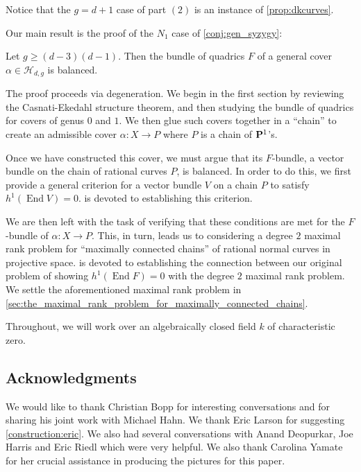\documentclass[11pt, two side, letterpaper, final]{amsart}
\renewcommand{\P}{{\bf P}}
\newcommand {\from}{\colon}
\DeclareMathOperator{\End}{End}
\renewcommand{\H}{{\mathcal{H}}}
\begin{document}
\begin{remark}
Notice that the $g = d+1$ case of part $(2)$ is an instance of  \cref{prop:dkcurves}.
\end{remark}




  Our main result is the proof of the $N_{1}$ case of \autoref{conj:gen_syzygy}:
\begin{maintheorem}\label{thm:gen_CE}
Let $g \geq (d-3)(d-1)$. Then the bundle of quadrics $F$ of a general cover $\alpha \in  \H_{d,g}$ is balanced.
\end{maintheorem}

The proof proceeds via degeneration.  We begin in the first section by reviewing the Casnati-Ekedahl structure theorem, and then studying the bundle of quadrics for covers of genus $0$ and $1$. We then glue such covers together in a ``chain'' to create an admissible cover $\alpha \from X \to P$ where $P$ is a chain of $\P^1$'s.

Once we have constructed this cover, we must argue that its $F$-bundle, a vector bundle on the chain of rational curves $P$, is balanced.
In order to do this, we first provide a general criterion for a vector bundle $V$ on a chain $P$ to satisfy $h^{1}(\End V) = 0$.
 is devoted to establishing this criterion.  

We are then left with the task of verifying that these conditions are met for the $F$-bundle of $\alpha \from X \to P$.  This, in turn, leads us to considering a degree $2$ maximal rank problem for ``maximally connected chains'' of rational normal curves in projective space.   is devoted to establishing the connection between our original problem of showing $h^{1}(\End F) = 0$ with the degree $2$ maximal rank problem.  
We settle the aforementioned maximal rank problem in \cref{sec:the_maximal_rank_problem_for_maximally_connected_chains}.

Throughout, we will work over an algebraically closed field $k$ of characteristic zero.

\subsection*{Acknowledgments}
We would like to thank Christian Bopp for interesting conversations and for sharing his joint work with Michael Hahn.  We thank Eric Larson for suggesting \cref{construction:eric}.   We also had several conversations with Anand Deopurkar, Joe Harris and Eric Riedl which were very helpful. We also thank Carolina Yamate for her crucial assistance in producing the pictures for this paper.
 
\end{document}
